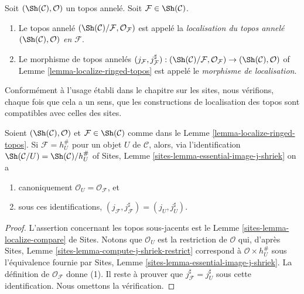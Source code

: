 \begin{definition}
\label{definition-localize-ringed-topos}
Soit $(\Sh(\mathcal{C}), \mathcal{O})$ un topos annelé.
Soit $\mathcal{F} \in \Sh(\mathcal{C})$.
\begin{enumerate}
\item Le topos annelé
$(\Sh(\mathcal{C})/\mathcal{F}, \mathcal{O}_\mathcal{F})$
est appelé la
{\it localisation du topos annelé
$(\Sh(\mathcal{C}), \mathcal{O})$ en $\mathcal{F}$}.
\item Le morphisme de topos annelés
$(j_\mathcal{F}, j_\mathcal{F}^\sharp) :
(\Sh(\mathcal{C})/\mathcal{F}, \mathcal{O}_\mathcal{F})
\to
(\Sh(\mathcal{C}), \mathcal{O})$ of
Lemme \ref{lemma-localize-ringed-topos}
est appelé le {\it morphisme de localisation}.
\end{enumerate}
\end{definition}

\noindent
Conformément à l'usage établi dans le chapitre sur les sites, nous
vérifions, chaque fois que cela a un sens, que les constructions de
localisation des topos sont compatibles avec celles des sites.

\begin{lemma}
\label{lemma-localize-compare}
Soient
$(\Sh(\mathcal{C}), \mathcal{O})$ et
$\mathcal{F} \in \Sh(\mathcal{C})$ comme dans le
Lemme \ref{lemma-localize-ringed-topos}.
Si $\mathcal{F} = h_U^\#$ pour un objet $U$ de $\mathcal{C}$, alors, via
l'identification
$\Sh(\mathcal{C}/U) = \Sh(\mathcal{C})/h_U^\#$ of
Sites, Lemme \ref{sites-lemma-essential-image-j-shriek}
on a
\begin{enumerate}
\item canoniquement $\mathcal{O}_U = \mathcal{O}_\mathcal{F}$, et
\item sous ces identifications,
$(j_\mathcal{F}, j_\mathcal{F}^\sharp) = (j_U, j_U^\sharp)$.
\end{enumerate}
\end{lemma}

\begin{proof}
L'assertion concernant les topos sous-jacents est le
Lemme \ref{sites-lemma-localize-compare} de Sites.
Notons que $\mathcal{O}_U$ est la restriction de $\mathcal{O}$ qui, d'après
Sites, Lemme \ref{sites-lemma-compute-j-shriek-restrict}
correspond à $\mathcal{O} \times h_U^\#$ sous l'équivalence fournie par
Sites, Lemme \ref{sites-lemma-essential-image-j-shriek}.
La définition de $\mathcal{O}_\mathcal{F}$ donne (1).
Il reste à prouver que $j_\mathcal{F}^\sharp = j_U^\sharp$ sous cette
identification. Nous omettons la vérification.
\end{proof}

